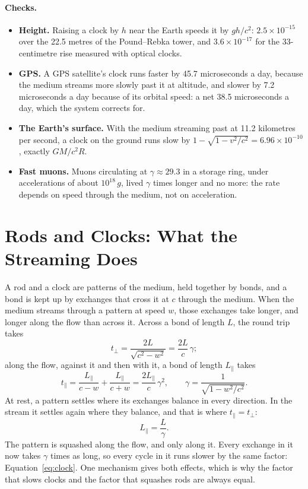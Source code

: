 \documentclass[11pt,a4paper]{article}
\begin{document}
\paragraph{Checks.}
\begin{itemize}
\item \textbf{Height.} Raising a clock by $h$ near the Earth speeds it by $gh/c^2$: $2.5\times10^{-15}$ over the 22.5 metres of the Pound--Rebka tower, and $3.6\times10^{-17}$ for the 33-centimetre rise measured with optical clocks.
\item \textbf{GPS.} A GPS satellite's clock runs faster by 45.7 microseconds a day, because the medium streams more slowly past it at altitude, and slower by 7.2 microseconds a day because of its orbital speed: a net 38.5 microseconds a day, which the system corrects for.
\item \textbf{The Earth's surface.} With the medium streaming past at 11.2 kilometres per second, a clock on the ground runs slow by $1-\sqrt{1-v^2/c^2} = 6.96\times10^{-10}$, exactly $GM/c^2R$.
\item \textbf{Fast muons.} Muons circulating at $\gamma \approx 29.3$ in a storage ring, under accelerations of about $10^{18}\,g$, lived $\gamma$ times longer and no more: the rate depends on speed through the medium, not on acceleration.
\end{itemize}

\section{Rods and Clocks: What the Streaming Does}
\label{sec:rulers}

\begin{hypbar}
A rod and a clock are patterns of the medium, held together by bonds, and a bond is kept up by exchanges that cross it at $c$ through the medium. When the medium streams through a pattern at speed $w$, those exchanges take longer, and longer along the flow than across it. Across a bond of length $L$, the round trip takes
\begin{equation}
t_\perp = \frac{2L}{\sqrt{c^2-w^2}} = \frac{2L}{c}\,\gamma ;
\end{equation}
along the flow, against it and then with it, a bond of length $L_\parallel$ takes
\begin{equation}
t_\parallel = \frac{L_\parallel}{c-w} + \frac{L_\parallel}{c+w} = \frac{2L_\parallel}{c}\,\gamma^2 ,
\qquad \gamma = \frac{1}{\sqrt{1-w^2/c^2}} .
\end{equation}
At rest, a pattern settles where its exchanges balance in every direction. In the stream it settles again where they balance, and that is where $t_\parallel = t_\perp$:
\begin{equation}
L_\parallel = \frac{L}{\gamma} .
\label{eq:squash}
\end{equation}
The pattern is squashed along the flow, and only along it. Every exchange in it now takes $\gamma$ times as long, so every cycle in it runs slower by the same factor: Equation~\eqref{eq:clock}. One mechanism gives both effects, which is why the factor that slows clocks and the factor that squashes rods are always equal.
\end{hypbar}
\end{document}
